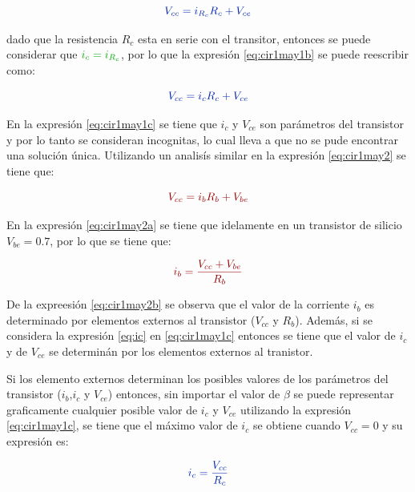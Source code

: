 \documentclass{article}
\begin{document}
\begin{equation}\label{eq:cir1may1b}
\color{blue}{V_{cc}=i_{R_{c}}R_{c}+V_{ce}}
\end{equation}

dado que la resistencia $R_{c}$ esta en serie con el transitor, entonces
se puede considerar que $\color{green}{i_{c}=i_{R_{c}}}$, por lo que la
expresión \eqref{eq:cir1may1b} se puede reescribir como:

\begin{equation}\label{eq:cir1may1c}
\color{blue}{V_{cc}=i_{c}R_{c}+V_{ce}}
\end{equation}

En la expresión \eqref{eq:cir1may1c} se tiene que $i_{c}$ y $V_{ce}$ son
parámetros del transistor y por lo tanto se consideran incognitas, lo
cual lleva a que no se pude encontrar una solución única. Utilizando un
analisís similar en la expresión \eqref{eq:cir1may2} se tiene que:

\begin{equation}\label{eq:cir1may2a}
\color{red}{V_{cc}=i_{b}R_{b}+V_{be}}
\end{equation}

En la expresión \eqref{eq:cir1may2a} se tiene que idelamente en un
transistor de silicio $V_{be}=0.7$, por lo que se tiene que:

\begin{equation}\label{eq:cir1may2b}
\color{red}{i_{b}=\frac{V_{cc}+V_{be}}{R_{b}}}
\end{equation}

De la expreesión \eqref{eq:cir1may2b} se observa que el valor de la
corriente $i_{b}$ es determinado por elementos externos al transistor
($V_{cc}$ y $R_{b}$). Además, si se considera la expresión \eqref{eq:ic}
en \eqref{eq:cir1may1c} entonces se tiene que el valor de $i_{c}$ y de
$V_{ce}$ se determinán por los elementos externos al tranistor.

Si los elemento externos determinan los posibles valores de los
parámetros del transistor ($i_{b}$,$i_{c}$ y $V_{ce}$) entonces, sin
importar el valor de $\beta$ se puede representar graficamente cualquier
posible valor de $i_{c}$ y $V_{ce}$ utilizando la expresión
\eqref{eq:cir1may1c}, se tiene que el máximo valor de $i_{c}$ se obtiene
cuando $V_{cc}=0$ y su expresión es:

\begin{equation}\label{eq:cir1icmax}
\color{blue}{i_{c}=\frac{V_{cc}}{R_{c}}}
\end{equation}
\end{document}
